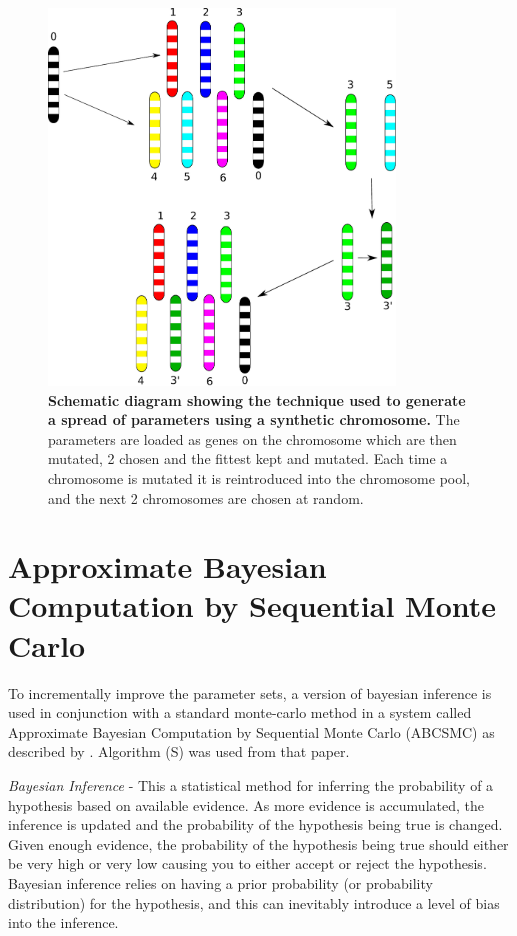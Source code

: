 \begin{figure}
\begin{center}
\includegraphics[height=10cm]{./03-parameterestimationmethodologies/data/sa_spread.pdf}
\end{center}
\caption[{Schematic diagram showing the technique used to generate a spread of parameters using a synthetic chromosome.}]{{\bf Schematic diagram showing the technique used to generate a spread of parameters using a synthetic chromosome.} The parameters are loaded as genes on the chromosome which are then mutated, 2 chosen and the fittest kept and mutated. Each time a chromosome is mutated it is reintroduced into the chromosome pool, and the next 2 chromosomes are chosen at random.
\label{fig:sa_spread}}
\end{figure} 





\section{Approximate Bayesian Computation by Sequential Monte Carlo}

To incrementally improve the parameter sets, a version of bayesian inference is used in conjunction with a standard monte-carlo method in a system called Approximate Bayesian Computation by Sequential Monte Carlo (ABCSMC) as described by \citet{Toni2009}. Algorithm (S) was used from that paper.

\textit{Bayesian Inference} - This a statistical method for inferring the probability of a hypothesis based on available evidence. As more evidence is accumulated, the inference is updated and the probability of the hypothesis being true is changed. Given enough evidence, the probability of the hypothesis being true should either be very high or very low causing you to either accept or reject the hypothesis. Bayesian inference relies on having a prior probability (or probability distribution) for the hypothesis, and this can inevitably introduce a level of bias into the inference.

